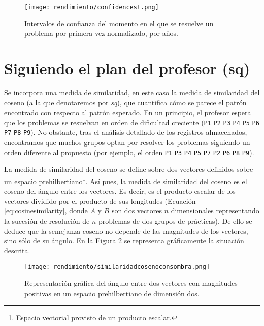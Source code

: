 \begin{figure}[H]
    \centering
    \texttt{[image: rendimiento/confidencest.png]}
    \caption{Intervalos de confianza del momento en el que se resuelve un problema por primera vez normalizado, por años.}
    \label{fig:confidenceearlybird}
\end{figure}

\section{Siguiendo el plan del profesor (sq)}

Se incorpora una medida de similaridad, en este caso la medida de similaridad del coseno (a la que denotaremos por \emph{sq}), que cuantifica cómo se parece el patrón encontrado con respecto al patrón esperado. En un principio, el profesor espera que los problemas se resuelvan en orden de dificultad creciente (\texttt{P1} \texttt{P2} \texttt{P3} \texttt{P4} \texttt{P5} \texttt{P6} \texttt{P7} \texttt{P8} \texttt{P9}). No obstante, tras el análisis detallado de los registros almacenados, encontramos que muchos grupos optan por resolver los problemas siguiendo un orden diferente al propuesto (por ejemplo, el orden \texttt{P1} \texttt{P3} \texttt{P4} \texttt{P5} \texttt{P7} \texttt{P2} \texttt{P6} \texttt{P8} \texttt{P9}).

La medida de similaridad del coseno se define sobre dos vectores definidos sobre un espacio prehilbertiano\footnote{Espacio vectorial provisto de un producto escalar.}. Así pues, la medida de similaridad del coseno es el coseno del ángulo entre los vectores. Es decir, es el producto escalar de los vectores dividido por el producto de sus longitudes (Ecuación \ref{eq:cosinesimilarity}, donde $A$ y $B$ son dos vectores $n$ dimensionales representando la sucesión de resolución de $n$ problemas de dos grupos de prácticas). De ello se deduce que la semejanza coseno no depende de las magnitudes de los vectores, sino sólo de su ángulo. En la Figura \ref{fig:cosinesimilarity} se representa gráficamente la situación descrita.

\begin{figure}[H]
    \centering
    \texttt{[image: rendimiento/similaridadcosenoconsombra.png]}
    \caption{Representación gráfica del ángulo entre dos vectores con magnitudes positivas en un espacio prehilbertiano de dimensión dos.}
    \label{fig:cosinesimilarity}
\end{figure}

